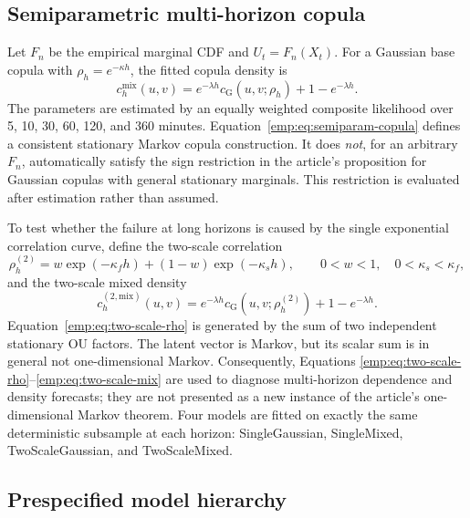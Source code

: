 \documentclass[11pt]{article}
\newcommand{\1}{\mathbf{1}}
\begin{document}
\subsection{Semiparametric multi-horizon copula}

Let $F_n$ be the empirical marginal CDF and $U_t=F_n(X_t)$.  For a Gaussian base
copula with $\rho_h=e^{-\kappa h}$, the fitted copula density is
\begin{equation}
c_h^{\mathrm{mix}}(u,v)
=e^{-\lambda h}c_{\mathrm{G}}(u,v;\rho_h)
+1-e^{-\lambda h}.
\label{emp:eq:semiparam-copula}
\end{equation}
The parameters are estimated by an equally weighted composite likelihood over
5, 10, 30, 60, 120, and 360 minutes.  Equation~\eqref{emp:eq:semiparam-copula}
defines a consistent stationary Markov copula construction.  It does
\emph{not}, for an arbitrary $F_n$, automatically satisfy the sign restriction
in the article's proposition for Gaussian copulas with general stationary
marginals.  This restriction is evaluated after estimation rather than assumed.

To test whether the failure at long horizons is caused by the single exponential
correlation curve, define the two-scale correlation
\begin{equation}
 \rho_h^{(2)}=w\exp(-\kappa_{f}h)+(1-w)\exp(-\kappa_{s}h),
 \qquad 0<w<1,\quad 0<\kappa_s<\kappa_f,
 \label{emp:eq:two-scale-rho}
\end{equation}
and the two-scale mixed density
\begin{equation}
 c_{h}^{(2,\mathrm{mix})}(u,v)
 =e^{-\lambda h}c_{\mathrm G}(u,v;\rho_h^{(2)})+1-e^{-\lambda h}.
 \label{emp:eq:two-scale-mix}
\end{equation}
Equation~\eqref{emp:eq:two-scale-rho} is generated by the sum of two independent
stationary OU factors.  The latent vector is Markov, but its scalar sum is in
general not one-dimensional Markov.  Consequently, Equations
\eqref{emp:eq:two-scale-rho}--\eqref{emp:eq:two-scale-mix} are used to diagnose
multi-horizon dependence and density forecasts; they are not presented as a new
instance of the article's one-dimensional Markov theorem.  Four models are fitted
on exactly the same deterministic subsample at each horizon: SingleGaussian,
SingleMixed, TwoScaleGaussian, and TwoScaleMixed.

\subsection{Prespecified model hierarchy}
\end{document}
